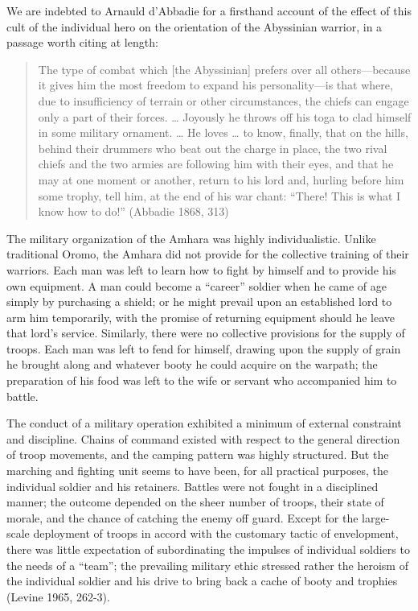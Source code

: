 We are indebted to Arnauld d'Abbadie for a firsthand account of the effect of this cult of the individual hero on the orientation of the Abyssinian warrior, in a passage worth citing at length:

\begin{quote}
The type of combat which [the Abyssinian] prefers over all others---because it gives him the most freedom to expand his personality---is that where, due to insufficiency of terrain or other circumstances, the chiefs can engage only a part of their forces. \ldots{} Joyously he throws off his toga to clad himself in some military ornament. \ldots{} He loves \ldots{} to know, finally, that on the hills, behind their drummers who beat out the charge in place, the two rival chiefs and the two armies are following him with their eyes, and that he may at one moment or another, return to his lord and, hurling before him some trophy, tell him, at the end of his war chant: ``There! This is what I know how to do!'' (Abbadie 1868, 313)
\end{quote}

The military organization of the Amhara was highly individualistic. Unlike traditional Oromo, the Amhara did not provide for the collective training of their warriors. Each man was left to learn how to fight by himself and to provide his own equipment. A man could become a ``career'' soldier when he came of age simply by purchasing a shield; or he might prevail upon an established lord to arm him temporarily, with the promise of returning equipment should he leave that lord's service. Similarly, there were no collective provisions for the supply of troops. Each man was left to fend for himself, drawing upon the supply of grain he brought along and whatever booty he could acquire on the warpath; the preparation of his food was left to the wife or servant who accompanied him to battle. 

The conduct of a military operation exhibited a minimum of external constraint and discipline. Chains of command existed with respect to the general direction of troop movements, and the camping pattern was highly structured. But the marching and fighting unit seems to have been, for all practical purposes, the individual soldier and his retainers. Battles were not fought in a disciplined manner; the outcome depended on the sheer number of troops, their state of morale, and the chance of catching the enemy off guard. Except for the large-scale deployment of troops in accord with the customary tactic of envelopment, there was little expectation of subordinating the impulses of individual soldiers to the needs of a ``team''; the prevailing military ethic stressed rather the heroism of the individual soldier and his drive to bring back a cache of booty and trophies (Levine 1965, 262-3).

